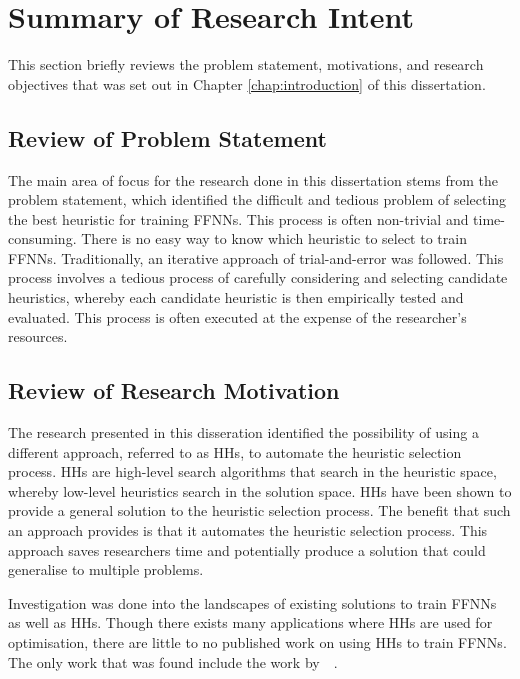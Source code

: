 \section{Summary of Research Intent}
\label{sec:conclusion:research_goals}

This section briefly reviews the problem statement, motivations, and research objectives that was set out in Chapter \ref{chap:introduction} of this dissertation.

\subsection{Review of Problem Statement}
\label{sec:conclusion:research_goals:problem_statement}

The main area of focus for the research done in this dissertation stems from the problem statement, which identified the difficult and tedious problem of selecting the best heuristic for training \acp{FFNN}. This process is often non-trivial and time-consuming. There is no easy way to know which heuristic to select to train \acp{FFNN}. Traditionally, an iterative approach of trial-and-error was followed. This process involves a tedious process of carefully considering and selecting candidate heuristics, whereby each candidate heuristic is then empirically tested and evaluated. This process is often executed at the expense of the researcher's resources.


\subsection{Review of Research Motivation}
\label{sec:conclusion:research_goals:motivations}

The research presented in this disseration identified the possibility of using a different approach, referred to as \acp{HH}, to automate the heuristic selection process. \acp{HH} are high-level search algorithms that search in the heuristic space, whereby low-level heuristics search in the solution space. \acp{HH} have been shown to provide a general solution to the heuristic selection process. The benefit that such an approach provides is that it automates the heuristic selection process. This approach saves researchers time and potentially produce a solution that could generalise to multiple problems.

Investigation was done into the landscapes of existing solutions to train \acp{FFNN} as well as \acp{HH}. Though there exists many applications where \acp{HH} are used for optimisation, there are little to no published work on using \acp{HH} to train \acp{FFNN}. The only work that was found include the work by~\citeauthor{ref:nel:2021}~\cite{ref:nel:2021}.

